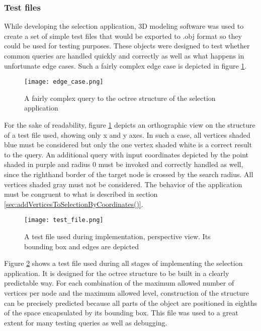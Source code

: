		\subsubsection{Test files}
		\label{sec:test_files}
While developing the selection application, 3D modeling software was used to create a set of simple test files that would be exported to .obj format so they could be used for testing purposes. These objects were designed to test whether common queries are handled quickly and correctly as well as what happens in unfortunate edge cases. Such a fairly complex edge case is depicted in figure \ref{fig:edge_case}.

\begin{figure}[htb]
  \centering
  \texttt{[image: edge\_case.png]}
  \caption{A fairly complex query to the octree structure of the selection application}\label{fig:edge_case}
\end{figure}

For the sake of readability, figure \ref{fig:edge_case} depicts an orthographic view on the structure of a test file used, showing only x and y axes. In such a case, all vertices shaded blue must be considered but only the one vertex shaded white is a correct result to the query. An additional query with input coordinates depicted by the point shaded in purple and radius 0 must be invoked and correctly handled as well, since the righthand border of the target node is crossed by the search radius. All vertices shaded gray must not be considered. The behavior of the application must be congruent to what is described in section \ref{sec:addVerticesToSelectionByCoordinates()}.

\begin{figure}[htb]
  \centering
  \texttt{[image: test\_file.png]}
  \caption{A test file used during implementation, perspective view. Its bounding box and edges are depicted}\label{fig:test_thing}
\end{figure}

Figure \ref{fig:test_thing} shows a test file used during all stages of implementing the selection application. It is designed for the octree structure to be built in a clearly predictable way. For each combination of the maximum allowed number of vertices per node and the maximum allowed level, construction of the structure can be precisely predicted because all parts of the object are positioned in eighths of the space encapsulated by its bounding box. This file was used to a great extent for many testing queries as well as debugging.

